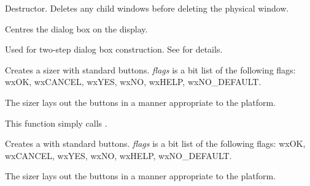 
Destructor. Deletes any child windows before deleting the physical window.


\label{wxdialogcentre}


Centres the dialog box on the display.




\label{wxdialogcreate}


Used for two-step dialog box construction. See \rtfsp
for details.


\label{wxdialogcreatebuttonsizer}


Creates a sizer with standard buttons. {\it flags} is a bit list
of the following flags: wxOK, wxCANCEL, wxYES, wxNO, wxHELP, wxNO\_DEFAULT.

The sizer lays out the buttons in a manner appropriate to the platform.

This function simply calls .


\label{wxdialogcreatestddialogbuttonsizer}


Creates a  with standard buttons. {\it flags} is a bit list
of the following flags: wxOK, wxCANCEL, wxYES, wxNO, wxHELP, wxNO\_DEFAULT.

The sizer lays out the buttons in a manner appropriate to the platform.


\label{wxdialogdook}

